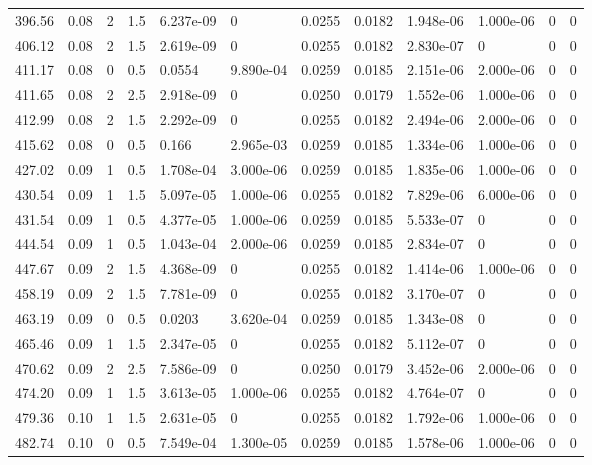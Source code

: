 \documentclass[preview]{standalone}
\begin{document}
{{{\begin{tabular}{L{1.2cm}C{1.2cm} C{0.3cm}C{0.5cm} C{1.4cm}C{1.4cm} C{1.4cm}C{1.4cm} C{1.6cm}C{1.6cm} C{1.6cm}C{1.6cm}}
  396.56  &  0.08  & 2     & 1.5 &  6.237e-09  & 0  &  0.0255&   0.0182& 1.948e-06 & 1.000e-06   &  0 & 0  \\ 
  406.12  &  0.08  & 2     & 1.5 &  2.619e-09  & 0  &  0.0255&   0.0182& 2.830e-07 & 0   &  0 & 0  \\ 
  411.17  &  0.08  & 0     & 0.5 &  0.0554  & 9.890e-04  &  0.0259&   0.0185& 2.151e-06 & 2.000e-06   &  0 & 0  \\ 
  411.65  &  0.08  & 2     & 2.5 &  2.918e-09  & 0  &  0.0250&   0.0179& 1.552e-06 & 1.000e-06   &  0 & 0  \\ 
  412.99  &  0.08  & 2     & 1.5 &  2.292e-09  & 0  &  0.0255&   0.0182& 2.494e-06 & 2.000e-06   &  0 & 0  \\ 
  415.62  &  0.08  & 0     & 0.5 &  0.166  & 2.965e-03  &  0.0259&   0.0185& 1.334e-06 & 1.000e-06   &  0 & 0  \\ 
  427.02  &  0.09  & 1     & 0.5 &  1.708e-04  & 3.000e-06  &  0.0259&   0.0185& 1.835e-06 & 1.000e-06   &  0 & 0  \\ 
  430.54  &  0.09  & 1     & 1.5 &  5.097e-05  & 1.000e-06  &  0.0255&   0.0182& 7.829e-06 & 6.000e-06   &  0 & 0  \\ 
  431.54  &  0.09  & 1     & 0.5 &  4.377e-05  & 1.000e-06  &  0.0259&   0.0185& 5.533e-07 & 0   &  0 & 0  \\ 
  444.54  &  0.09  & 1     & 0.5 &  1.043e-04  & 2.000e-06  &  0.0259&   0.0185& 2.834e-07 & 0   &  0 & 0  \\ 
  447.67  &  0.09  & 2     & 1.5 &  4.368e-09  & 0  &  0.0255&   0.0182& 1.414e-06 & 1.000e-06   &  0 & 0  \\ 
  458.19  &  0.09  & 2     & 1.5 &  7.781e-09  & 0  &  0.0255&   0.0182& 3.170e-07 & 0   &  0 & 0  \\ 
  463.19  &  0.09  & 0     & 0.5 &  0.0203  & 3.620e-04  &  0.0259&   0.0185& 1.343e-08 & 0   &  0 & 0  \\ 
  465.46  &  0.09  & 1     & 1.5 &  2.347e-05  & 0  &  0.0255&   0.0182& 5.112e-07 & 0   &  0 & 0  \\ 
  470.62  &  0.09  & 2     & 2.5 &  7.586e-09  & 0  &  0.0250&   0.0179& 3.452e-06 & 2.000e-06   &  0 & 0  \\ 
  474.20  &  0.09  & 1     & 1.5 &  3.613e-05  & 1.000e-06  &  0.0255&   0.0182& 4.764e-07 & 0   &  0 & 0  \\ 
  479.36  &  0.10  & 1     & 1.5 &  2.631e-05  & 0  &  0.0255&   0.0182& 1.792e-06 & 1.000e-06   &  0 & 0  \\ 
  482.74  &  0.10  & 0     & 0.5 &  7.549e-04  & 1.300e-05  &  0.0259&   0.0185& 1.578e-06 & 1.000e-06   &  0 & 0  \\ 

\end{tabular}}}}
\end{document}
